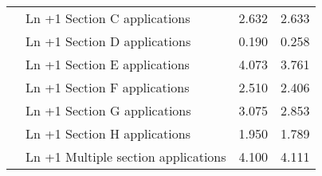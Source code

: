 \begin{tabular}[t]{llrr}
 & Ln +1 Section C applications & \num{2.632} & \num{2.633}\\
 & Ln +1 Section D applications & \num{0.190} & \num{0.258}\\
 & Ln +1 Section E applications & \num{4.073} & \num{3.761}\\
 & Ln +1 Section F applications & \num{2.510} & \num{2.406}\\
 & Ln +1 Section G applications & \num{3.075} & \num{2.853}\\
 & Ln +1 Section H applications & \num{1.950} & \num{1.789}\\
 & Ln +1 Multiple section applications & \num{4.100} & \num{4.111}\\
\bottomrule
\end{tabular}
